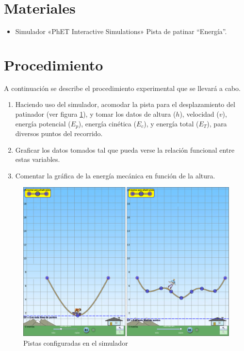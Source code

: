 \documentclass[letter,11pt]{article}
\begin{document}
\section{Materiales}
\begin{itemize}
    \item Simulador «PhET Interactive Simulations» Pista de patinar ``Energía''.
\end{itemize}

\section{Procedimiento}
A continuación se describe el procedimiento experimental que se llevará a
cabo.

\begin{enumerate}
\item Haciendo uso del simulador, acomodar la pista para el desplazamiento del
    patinador (ver figura \ref{pistas}), y tomar los datos de altura ($h$),
    velocidad ($v$), energía potencial ($E_p$), energía cinética ($E_c$), y
    energía total ($E_T$), para diversos puntos del recorrido.
\item Graficar los datos tomados tal que pueda verse la relación funcional entre
    estas variables.
\item Comentar la gráfica de la energía mecánica en función de la altura.
\end{enumerate}

\vspace*{2.5cm}
\begin{figure}[!h]
\centering
\includegraphics[scale=0.30]{resources/pistas.eps}
\caption{Pistas configuradas en el simulador}
\label{pistas}
\end{figure}
\end{document}
